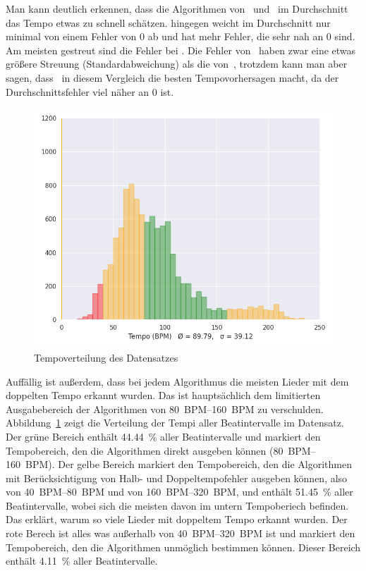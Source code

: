 {{		%
		Man kann deutlich erkennen,
			dass die Algorithmen von~\cite{2001_BeatThis} und~\cite{2011_PlRoSt} im Durchschnitt das Tempo etwas zu schnell schätzen.
		\cite{2009_DaPlSt} hingegen weicht im Durchschnitt nur minimal von einem Fehler von 0 ab und
			hat mehr Fehler, die sehr nah an 0 sind.
		Am meisten gestreut sind die Fehler bei \cite{2001_BeatThis}.
		Die Fehler von~\cite{2009_DaPlSt} haben zwar eine etwas größere Streuung (Standardabweichung) als die von~\cite{2011_PlRoSt},
			trotzdem kann man aber sagen,
			dass~\cite{2009_DaPlSt} in diesem Vergleich die besten Tempovorhersagen macht,
			da der Durchschnittsfehler viel näher an 0 ist.

		\begin{figure}[h]
			\centering
			\includegraphics[scale=0.45]{resources/dataset_tempo_histogram.png}
			\caption{Tempoverteilung des Datensatzes}
			\label{fig:dataset_tempo}
		\end{figure}

		Auffällig ist außerdem,
			dass bei jedem Algorithmus die meisten Lieder mit dem doppelten Tempo erkannt wurden.
		Das ist hauptsächlich dem limitierten Ausgabebereich der Algorithmen von \SIrange{80}{160}{BPM} zu verschulden.
		Abbildung~\ref{fig:dataset_tempo} zeigt die Verteilung der Tempi aller Beatintervalle im Datensatz.
		Der grüne Bereich enthält \SI{44.44}{\percent} aller Beatintervalle
			und markiert den Tempobereich,
			den die Algorithmen direkt ausgeben können (\SIrange{80}{160}{BPM}).
		Der gelbe Bereich markiert den Tempobereich,
			den die Algorithmen mit Berücksichtigung von Halb- und Doppeltempofehler ausgeben können,
			also von \SIrange{40}{80}{BPM} und von \SIrange{160}{320}{BPM},
			und enthält \SI{51.45}{\percent} aller Beatintervalle,
			wobei sich die meisten davon im untern Tempoberiech befinden.
		Das erklärt,
			warum so viele Lieder mit doppeltem Tempo erkannt wurden.
		Der rote Berech ist alles was außerhalb von \SIrange{40}{320}{BPM} ist
			und markiert den Tempobereich,
			den die Algorithmen unmöglich bestimmen können.
		Dieser Bereich enthält \SI{4.11}{\percent} aller Beatintervalle.
	}

}
